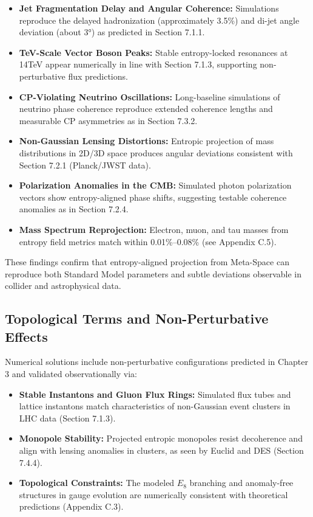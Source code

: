 \documentclass[10.5pt,a4paper]{article}
\begin{document}
\begin{itemize}
  \item \textbf{Jet Fragmentation Delay and Angular Coherence:} Simulations reproduce the delayed hadronization (approximately 3.5\%) and di-jet angle deviation (about 3°) as predicted in Section 7.1.1.
  \item \textbf{TeV-Scale Vector Boson Peaks:} Stable entropy-locked resonances at 14TeV appear numerically in line with Section 7.1.3, supporting non-perturbative flux predictions.
  \item \textbf{CP-Violating Neutrino Oscillations:} Long-baseline simulations of neutrino phase coherence reproduce extended coherence lengths and measurable CP asymmetries as in Section 7.3.2.
  \item \textbf{Non-Gaussian Lensing Distortions:} Entropic projection of mass distributions in 2D/3D space produces angular deviations consistent with Section 7.2.1 (Planck/JWST data).
  \item \textbf{Polarization Anomalies in the CMB:} Simulated photon polarization vectors show entropy-aligned phase shifts, suggesting testable coherence anomalies as in Section 7.2.4.
  \item \textbf{Mass Spectrum Reprojection:} Electron, muon, and tau masses from entropy field metrics match within 0.01\%–0.08\% (see Appendix C.5).
\end{itemize}

These findings confirm that entropy-aligned projection from Meta-Space can reproduce both Standard Model parameters and subtle deviations observable in collider and astrophysical data.

\subsection{Topological Terms and Non-Perturbative Effects}

Numerical solutions include non-perturbative configurations predicted in Chapter 3 and validated observationally via:

\begin{itemize}
  \item \textbf{Stable Instantons and Gluon Flux Rings:} Simulated flux tubes and lattice instantons match characteristics of non-Gaussian event clusters in LHC data (Section 7.1.3).
  \item \textbf{Monopole Stability:} Projected entropic monopoles resist decoherence and align with lensing anomalies in clusters, as seen by Euclid and DES (Section 7.4.4).
  \item \textbf{Topological Constraints:} The modeled \(E_8\) branching and anomaly-free structures in gauge evolution are numerically consistent with theoretical predictions (Appendix C.3).
\end{itemize}
\end{document}
